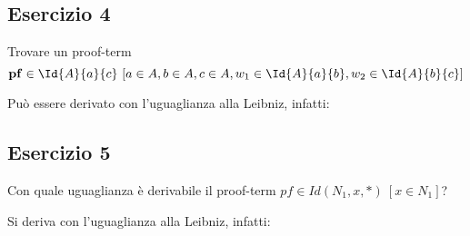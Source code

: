 
%

\subsection{Esercizio 4}
\begin{thm}
	Trovare un proof-term
	\[ \mathbf{pf} \in \Id{A}{a}{c}\ [a\in A, b\in A, c\in A, w_1 \in \Id{A}{a}{b}, w_2 \in \Id{A}{b}{c} ] \]
\end{thm}

Può essere derivato con l'uguaglianza alla Leibniz, infatti:



%

\subsection{Esercizio 5}
\begin{thm}
	Con quale uguaglianza è derivabile il proof-term $pf\in Id(N_1, x, \ast)~[x\in N_1]$?
\end{thm}
Si deriva con l'uguaglianza alla Leibniz, infatti:



